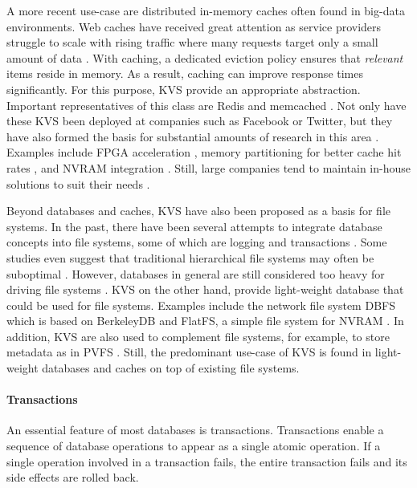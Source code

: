 A more recent use-case are distributed in-memory caches often found in big-data
environments. Web caches have received great attention as service providers
struggle to scale with rising traffic where many requests target only a small
amount of data \cite{xu2014characterizing}. With caching, a dedicated eviction
policy ensures that \emph{relevant} items reside in memory. As a result, caching
can improve response times significantly. For this purpose, KVS provide an
appropriate abstraction. Important representatives of this class are Redis
\cite{redis2017home} and memcached \cite{memcached2017home}. Not only have these
KVS been deployed at companies such as Facebook or Twitter, but they have also
formed the basis for substantial amounts of research in this area
\cite{xu2014characterizing}. Examples include FPGA acceleration
\cite{lavasani2014fpga}, memory partitioning for better cache hit rates
\cite{carra2014memory}, and NVRAM integration \cite{wu2016nvmcached,
malinowski2017using}. Still, large companies tend to maintain in-house solutions
to suit their needs \cite{chang2008bigtable, decandia2007dynamo,
lakshman2010cassandra, wang2015hydradb}.

Beyond databases and caches, KVS have also been proposed as a basis for file
systems. In the past, there have been several attempts to integrate database
concepts into file systems, some of which are logging \cite{rosenblum1992design,
tweedie1998journaling} and transactions \cite{seltzer1990transaction,
wright2007extending, spillane2009enabling}. Some studies even suggest that
traditional hierarchical file systems may often be suboptimal
\cite{stein2005stupid, seltzer2009hierarchical}. However, databases in general
are still considered too heavy for driving file systems
\cite{seltzer2009hierarchical}. KVS on the other hand, provide light-weight
database that could be used for file systems. Examples include the network file
system DBFS which is based on BerkeleyDB \cite{murphy2002design} and FlatFS, a
simple file system for NVRAM \cite{volos2014aerie}. In addition, KVS are also
used to complement file systems, for example, to store metadata as in PVFS
\cite{carns2009small}. Still, the predominant use-case of KVS is found in
light-weight databases and caches on top of existing file systems.

\paragraph{Transactions}

An essential feature of most databases is transactions. Transactions enable a
sequence of database operations to appear as a single atomic operation. If a
single operation involved in a transaction fails, the entire transaction fails and its side effects are rolled back.

